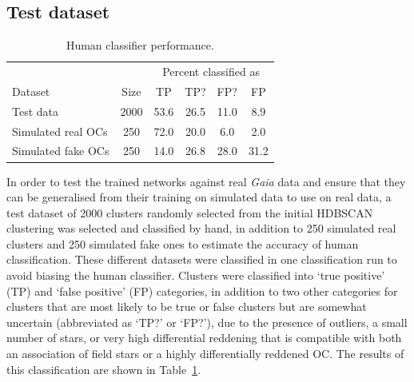
\subsection{Test dataset}\label{c3:sec:cmd_classifier:test_data}

\begin{table}
\caption{Human classifier performance.}
\centering
\label{c3:tab:human_classifier}
\begin{tabular}{l c | c c c c}
\hline\hline
 & & \multicolumn{4}{c}{Percent classified as} \\
Dataset & Size & TP & TP? & FP? & FP \\
\hline
Test data          & 2000 & 53.6 & 26.5 & 11.0 & 8.9 \\
Simulated real OCs & 250  & 72.0 & 20.0 & 6.0  & 2.0 \\
Simulated fake OCs & 250  & 14.0 & 26.8 & 28.0 & 31.2 \\
\hline
\end{tabular}
\end{table}

In order to test the trained networks against real \emph{Gaia} data and ensure that they can be generalised from their training on simulated data to use on real data, a test dataset of 2000 clusters randomly selected from the initial HDBSCAN clustering was selected and classified by hand, in addition to 250 simulated real clusters and 250 simulated fake ones to estimate the accuracy of human classification. These different datasets were classified in one classification run to avoid biasing the human classifier. Clusters were classified into `true positive' (TP) and `false positive' (FP) categories, in addition to two other categories for clusters that are most likely to be true or false clusters but are somewhat uncertain (abbreviated as `TP?' or `FP?'), due to the presence of outliers, a small number of stars, or very high differential reddening that is compatible with both an association of field stars or a highly differentially reddened OC. The results of this classification are shown in Table~\ref{c3:tab:human_classifier}.

